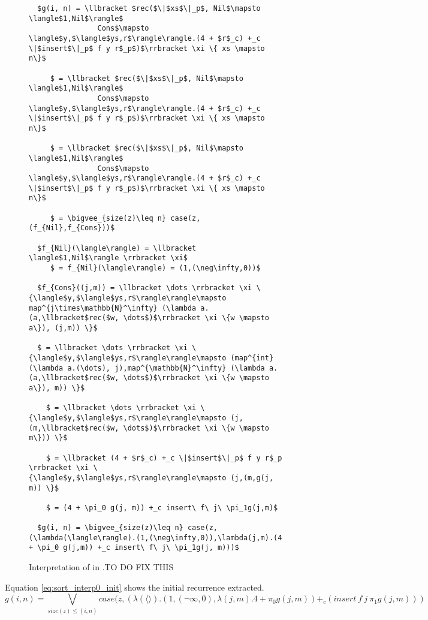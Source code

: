 \begin{figure}[H]
  \caption{Interpretation of  in .TO DO FIX THIS}
  \label{fig:sort_rec_interp}
  \begin{lstlisting}
  $g(i, n) = \llbracket $rec($\|$xs$\|_p$, Nil$\mapsto \langle$1,Nil$\rangle$
                Cons$\mapsto \langle$y,$\langle$ys,r$\rangle\rangle.(4 + $r$_c) +_c \|$insert$\|_p$ f y r$_p$)$\rrbracket \xi \{ xs \mapsto n\}$

     $ = \llbracket $rec($\|$xs$\|_p$, Nil$\mapsto \langle$1,Nil$\rangle$
                Cons$\mapsto \langle$y,$\langle$ys,r$\rangle\rangle.(4 + $r$_c) +_c \|$insert$\|_p$ f y r$_p$)$\rrbracket \xi \{ xs \mapsto n\}$

     $ = \llbracket $rec($\|$xs$\|_p$, Nil$\mapsto \langle$1,Nil$\rangle$
                Cons$\mapsto \langle$y,$\langle$ys,r$\rangle\rangle.(4 + $r$_c) +_c \|$insert$\|_p$ f y r$_p$)$\rrbracket \xi \{ xs \mapsto n\}$

     $ = \bigvee_{size(z)\leq n} case(z,(f_{Nil},f_{Cons}))$

  $f_{Nil}(\langle\rangle) = \llbracket \langle$1,Nil$\rangle \rrbracket \xi$
     $ = f_{Nil}(\langle\rangle) = (1,(\neg\infty,0))$

  $f_{Cons}((j,m)) = \llbracket \dots \rrbracket \xi \{\langle$y,$\langle$ys,r$\rangle\rangle\mapsto map^{j\times\mathbb{N}^\infty} (\lambda a.(a,\llbracket$rec($w, \dots$)$\rrbracket \xi \{w \mapsto a\}), (j,m)) \}$

  $ = \llbracket \dots \rrbracket \xi \{\langle$y,$\langle$ys,r$\rangle\rangle\mapsto (map^{int} (\lambda a.(\dots), j),map^{\mathbb{N}^\infty} (\lambda a.(a,\llbracket$rec($w, \dots$)$\rrbracket \xi \{w \mapsto a\}), m)) \}$

    $ = \llbracket \dots \rrbracket \xi \{\langle$y,$\langle$ys,r$\rangle\rangle\mapsto (j,(m,\llbracket$rec($w, \dots$)$\rrbracket \xi \{w \mapsto m\})) \}$

    $ = \llbracket (4 + $r$_c) +_c \|$insert$\|_p$ f y r$_p \rrbracket \xi \{\langle$y,$\langle$ys,r$\rangle\rangle\mapsto (j,(m,g(j, m)) \}$

    $ = (4 + \pi_0 g(j, m)) +_c insert\ f\ j\ \pi_1g(j,m)$

  $g(i, n) = \bigvee_{size(z)\leq n} case(z,(\lambda(\langle\rangle).(1,(\neg\infty,0)),\lambda(j,m).(4 + \pi_0 g(j,m)) +_c insert\ f\ j\ \pi_1g(j, m)))$
  \end{lstlisting}
\end{figure}


Equation \ref{eq:sort_interp0_init} shows the initial recurrence extracted.
\begin{equation}
  \label{eq:sort_interp0_init}
  g(i,n) = \bigvee_{size(z)\leq (i,n)} case(z,(\lambda(\langle\rangle).(1,(\neg\infty,0),\lambda(j,m).4 + \pi_0 g(j,m)) +_c(insert\ f\ j\ \pi_1g(j, m)))
\end{equation}


